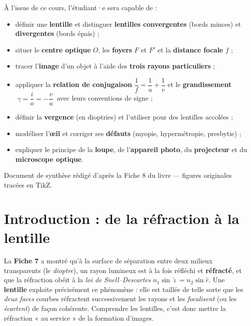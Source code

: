 \documentclass[11pt,a4paper]{article}
\newcommand{\gamm}{\gamma}             %
\newcommand{\angi}{\hat{\imath}}        %
\newcommand{\angr}{\hat{r}}             %
\begin{document}
\begin{tcolorbox}[boxbase,colback=primary!5,colframe=primary,width=15cm,
    title={\textsc{Objectifs pédagogiques de la fiche}}]
À l'issue de ce cours, l'étudiant·e sera capable de :
\begin{itemize}[leftmargin=1.6em,topsep=2pt,itemsep=1pt]
  \item définir une \textbf{lentille} et distinguer \textbf{lentilles convergentes} (bords minces)
        et \textbf{divergentes} (bords épais) ;
  \item situer le \textbf{centre optique} $O$, les \textbf{foyers} $F$ et $F'$ et la \textbf{distance focale} $f$ ;
  \item tracer l'\textbf{image} d'un objet à l'aide des \textbf{trois rayons particuliers} ;
  \item appliquer la \textbf{relation de conjugaison} $\dfrac{1}{f}=\dfrac{1}{u}+\dfrac{1}{v}$ et le
        \textbf{grandissement} $\;\gamm=\dfrac{i}{o}=-\dfrac{v}{u}$\, avec leurs conventions de signe ;
  \item définir la \textbf{vergence} (en dioptries) et l'utiliser pour des lentilles accolées ;
  \item modéliser l'\textbf{œil} et corriger ses \textbf{défauts} (myopie, hypermétropie, presbytie) ;
  \item expliquer le principe de la \textbf{loupe}, de l'\textbf{appareil photo}, du \textbf{projecteur}
        et du \textbf{microscope optique}.
\end{itemize}
\end{tcolorbox}

\vspace{0.5cm}
{\small\color{black!60} Document de synthèse rédigé d'après la Fiche 8 du livre — figures originales tracées en TikZ.}
\par
\endgroup

\newpage
\renewcommand{\contentsname}{\textcolor{primarydark}{Table des matières}}
\tableofcontents
\thispagestyle{fancy}
\newpage

\section{Introduction : de la réfraction à la lentille}
La \textbf{Fiche 7} a montré qu'à la surface de séparation entre deux milieux transparents (le
\emph{dioptre}), un rayon lumineux est à la fois réfléchi et \textbf{réfracté}, et que la réfraction
obéit à la \emph{loi de Snell--Descartes} $n_1\sin\angi=n_2\sin\angr$. Une \textbf{lentille} exploite
précisément ce phénomène : elle est taillée de telle sorte que les \emph{deux faces} courbes
réfractent successivement les rayons et les \emph{focalisent} (ou les \emph{écartent}) de façon
cohérente. Comprendre les lentilles, c'est donc mettre la réfraction « au service » de la formation
d'images.
\end{document}

